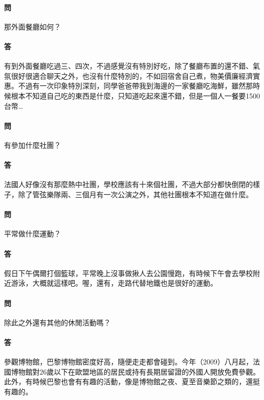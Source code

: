 \documentclass[a4paper]{article}
\begin{document}
\paragraph{問}
那外面餐廳如何？
\paragraph{答}
有到外面餐廳吃過三、四次，不過感覺沒有特別好吃，除了餐廳布置的還不錯、氣氛很好很適合聊天之外，也沒有什麼特別的，不如回宿舍自己煮，物美價廉經濟實惠。不過有一次印象特別深刻，同學爸爸帶我到海邊的一家餐廳吃海鮮，雖然那時候根本不知道自己吃的東西是什麼，只知道吃起來還不錯，但是一個人一餐要1500台幣…
\paragraph{問}
有參加什麼社團？
\paragraph{答}
法國人好像沒有那麼熱中社團，學校應該有十來個社團，不過大部分都快倒閉的樣子，除了管弦樂隊兩、三個月有一次公演之外，其他社團根本不知道在做什麼。
\paragraph{問}
平常做什麼運動？
\paragraph{答}
假日下午偶爾打個籃球，平常晚上沒事做揪人去公園慢跑，有時候下午會去學校附近游泳，大概就這樣吧。喔，還有，走路代替地鐵也是很好的運動。
\paragraph{問}
除此之外還有其他的休閒活動嗎？
\paragraph{答}
參觀博物館，巴黎博物館密度好高，隨便走走都會碰到。今年（2009）八月起，法國博物館對26歲以下在歐盟地區的居民或持有長期居留證的外國人開放免費參觀。此外，有時候巴黎也會有有趣的活動，像是博物館之夜、夏至音樂節之類的，還挺有趣的。
\end{document}
